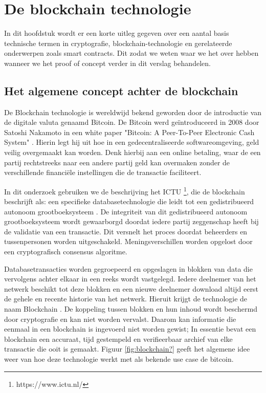 \chapter{De blockchain technologie}\label{chap:q1}
In dit hoofdstuk wordt er een korte uitleg gegeven over een aantal basis technische termen in cryptografie, blockchain-technologie en gerelateerde onderwerpen zoals smart contracts. Dit zodat we weten waar we het over hebben wanneer we het proof of concept verder in dit verslag behandelen.

\section{Het algemene concept achter de blockchain}
De Blockchain technologie is wereldwijd bekend geworden door de introductie van de digitale valuta genaamd Bitcoin. De Bitcoin werd geïntroduceerd in 2008 door Satoshi Nakamoto in een white paper "Bitcoin: A Peer-To-Peer Electronic Cash System" \cite{bitcoinPaper}. Hierin legt hij uit hoe in een gedecentraliseerde softwareomgeving, geld veilig overgemaakt kan worden. Denk hierbij aan een online betaling, waar de een partij rechtstreeks naar een andere partij geld kan overmaken zonder de verschillende financiële instellingen die de transactie faciliteert.\par

In dit onderzoek gebruiken we de beschrijving het ICTU \footnote{https://www.ictu.nl/}, die de blockchain beschrijft als: een specifieke databasetechnologie die leidt tot een gedistribueerd autonoom grootboeksysteem \cite{kaptijn}. De integriteit van dit gedistribueerd autonoom grootboeksysteem wordt gewaarborgd doordat iedere partij zeggenschap heeft bij de validatie van een transactie. Dit versnelt het proces doordat beheerders en tussenpersonen worden uitgeschakeld. Meningsverschillen worden opgelost door een cryptografisch consensus algoritme.\par
\newpage

Databasetransacties worden gegroepeerd en opgeslagen in blokken van data die vervolgens achter elkaar in een reeks wordt vastgelegd. Iedere deelnemer van het netwerk beschikt tot deze blokken en een nieuwe deelnemer download altijd eerst de gehele en recente historie van het netwerk. Hieruit krijgt de technologie de naam Blockchain \cite{blochchainTechSymmbioticDev}. De koppeling tussen blokken en hun inhoud wordt beschermd door cryptografie en kan niet worden vervalst. Daarom kan informatie die eenmaal in een blockchain is ingevoerd niet worden gewist; In essentie bevat een blockchain een accuraat, tijd gestempeld en verifieerbaar archief van elke transactie die ooit is gemaakt. Figuur \ref{fig:blockchain?} geeft het algemene idee weer van hoe deze technologie werkt met als bekende use case de bitcoin.\par

